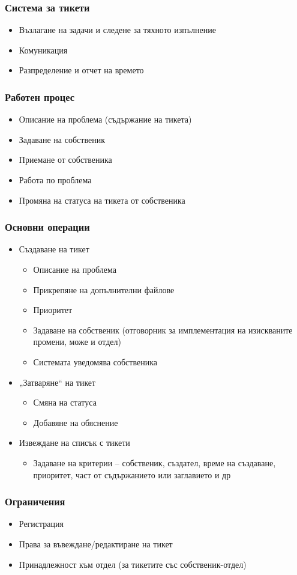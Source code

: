 \begin{frame}
  \frametitle{Система за тикети}
  \begin{itemize}
    \item Възлагане на задачи и следене за тяхното изпълнение
    \item Комуникация
    \item Разпределение и отчет на времето
  \end{itemize}
\end{frame}

\begin{frame}
  \frametitle{Работен процес}
  \begin{itemize}
    \item Описание на проблема (съдържание на тикета)
    \item Задаване на собственик
    \item Приемане от собственика
    \item Работа по проблема
    \item Промяна на статуса на тикета от собственика
  \end{itemize}
\end{frame}

\begin{frame}
  \frametitle{Основни операции}
  \begin{itemize}
    \item Създаване на тикет
      \begin{itemize}
	\item Описание на проблема
	\item Прикрепяне на допълнителни файлове
	\item Приоритет
	\item Задаване на собственик (отговорник за имплементация на изискваните промени, може и отдел)
	\item Системата уведомява собственика
      \end{itemize}

    \item „Затваряне“ на тикет
      \begin{itemize}
	\item Смяна на статуса
	\item Добавяне на обяснение
      \end{itemize}
    \item Извеждане на списък с тикети
      \begin{itemize}
      	\item Задаване на критерии – собственик, създател, време на създаване, приоритет, част от съдържанието или заглавието и др
      \end{itemize}
  \end{itemize}
\end{frame}

\begin{frame}
  \frametitle{Ограничения}
  \begin{itemize}
    \item Регистрация
    \item Права за въвеждане/редактиране на тикет
    \item Принадлежност към отдел (за тикетите със собственик-отдел)
  \end{itemize}
\end{frame}

